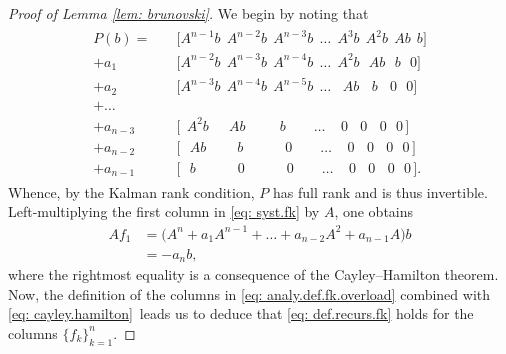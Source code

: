 \documentclass[journal,twoside,web]{ieeecolor}
\begin{document}
\begin{proof}[Proof of Lemma \ref{lem: brunovski}]
We begin by noting that
\begin{align}\label{eq: syst.fk}
\begin{aligned}
P(b)
= \quad &\Big[A^{n-1} b  \ \ A^{n-2}b \ \ A^{n-3}b \ \ \ldots  \ \ A^3b \ \  A^2b \ \ Ab \ \ b\Big]\\
+ a_1 &\Big[ A^{n-2}b \ \  A^{n-3}b \ \ A^{n-4}b \ \ \ldots \ \ A^2b  \ \ \ Ab \ \ \ b \ \ \ 0\Big]\\
+ a_2 &\Big[ A^{n-3}b \ \ A^{n-4}b \ \ A^{n-5}b \ \  \ldots \ \ \ \, Ab  \ \ \ \ b \ \ \ \ 0  \ \ \  0  \Big] \\
+ \ldots &\\
 + a_{n-3} &\Big[ \ \ A^2b  \quad \ \ Ab \qquad \ \ b \qquad \ldots \ \ \ \ \ 0  \ \ \ \  0 \ \ \ \ 0 \ \ \ 0 \, \Big]\\
 + a_{n-2} &\Big[ \ \ \ Ab  \qquad \ b \qquad \quad 0 \qquad \ldots \ \ \ \ \ 0  \ \ \ \  0 \ \ \ \ 0 \ \ \ 0 \, \Big]\\
 + a_{n-1} &\Big[ \ \ \ b  \qquad \quad 0  \qquad \quad 0 \qquad \ldots \ \ \ \ \ 0  \ \ \ \  0 \ \ \ \ 0 \ \ \ 0 \, \Big].
\end{aligned}
\end{align}
Whence, by the Kalman rank condition, $P$ has full rank and is thus invertible.
Left-multiplying the first column in \eqref{eq: syst.fk} by $A$, one obtains
\begin{align} \label{eq: cayley.hamilton}
Af_1 &= \big(A^n +a_1A^{n-1} + \ldots + a_{n-2}A^2 + a_{n-1}A\big)b \nonumber \\
&= -a_n b,
\end{align}
where the rightmost equality is a consequence of the Cayley–Hamilton theorem.
Now, the definition of the columns in \eqref{eq: analy.def.fk.overload} combined with \eqref{eq: cayley.hamilton} leads us to deduce that \eqref{eq: def.recurs.fk} holds for the columns $\{f_k\}_{k=1}^n$.

\end{proof}
\end{document}
